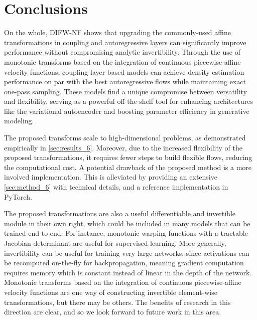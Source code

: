 \section{Conclusions}\label{sec:conclusions_6}

On the whole, DIFW-NF shows that upgrading the commonly-used affine transformations in coupling and autoregressive layers can significantly improve performance without compromising analytic invertibility. Through the use of monotonic transforms based on the integration of continuous piecewise-affine velocity functions, coupling-layer-based models can achieve density-estimation performance on par with the best autoregressive flows while maintaining exact one-pass sampling. These models find a unique compromise between versatility and flexibility, serving as a powerful off-the-shelf tool for enhancing architectures like the variational autoencoder and boosting parameter efficiency in generative modeling.

The proposed transforms scale to high-dimensional problems, as demonstrated empirically in \cref{sec:results_6}.
Moreover, due to the increased flexibility of the proposed transformations, it requires fewer steps to build flexible flows, reducing the computational cost. %
A potential drawback of the proposed method is a more involved implementation. This is alleviated by providing an extensive \cref{sec:method_6} with technical details, and a reference implementation in PyTorch.

The proposed transformations are also a useful differentiable and invertible module in their own right, which could be included in many models that can be trained end-to-end. For instance, monotonic warping functions with a tractable Jacobian determinant are useful for supervised learning. More generally, invertibility can be useful for training very large networks, since activations can be recomputed on-the-fly for backpropagation, meaning gradient computation requires memory which is constant instead of linear in the depth of the network.
Monotonic transforms based on the integration of continuous piecewise-affine velocity functions are one way of constructing invertible element-wise transformations, but there may be others. The benefits of research in this direction are clear, and so we look forward to future work in this area.

